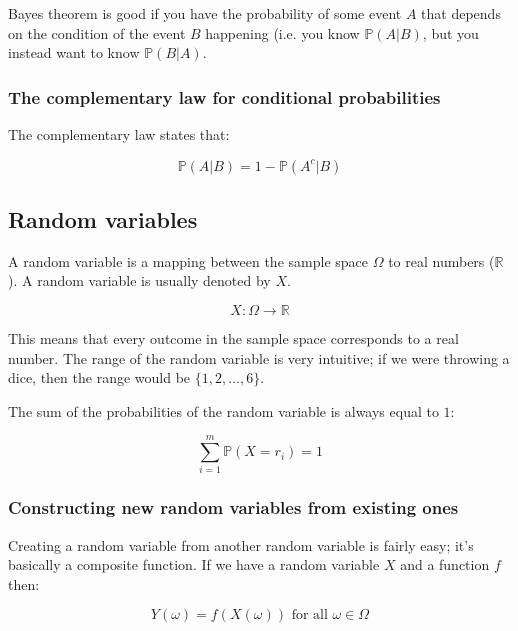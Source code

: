 Bayes theorem is good if you have the probability of some event $A$ that depends
on the condition of the event $B$ happening (i.e. you know $\mathbb{P}(A|B)$,
but you instead want to know $\mathbb{P}(B|A)$.

\subsubsection{The complementary law for conditional probabilities}

The complementary law states that:

\begin{dmath*}
	\mathbb{P}(A|B) = 1 - \mathbb{P}(A^c|B)
\end{dmath*}

\subsection{Random variables}

A random variable is a mapping between the sample space $\Omega$ to real numbers
($\mathbb{R}$). A random variable is usually denoted by $X$.

\begin{dmath*}
	X : \Omega \rightarrow \mathbb{R}
\end{dmath*}

This means that every outcome in the sample space corresponds to a real number.
The range of the random variable is very intuitive; if we were throwing a dice,
then the range would be $\{1, 2, \dots, 6\}$.

The sum of the probabilities of the random variable is always equal to $1$:

\begin{dmath*}
	\sum\limits_{i=1}^m\mathbb{P}(X=r_i) = 1
\end{dmath*}

\subsubsection{Constructing new random variables from existing ones}
\label{subsec:new_random_vars}
Creating a random variable from another random variable is fairly easy; it's
basically a composite function. If we have a random variable $X$ and a function
$f$ then:

\begin{dmath*}
	Y(\omega) = f(X(\omega)) \textrm{ for all $\omega \in \Omega$}
\end{dmath*}

